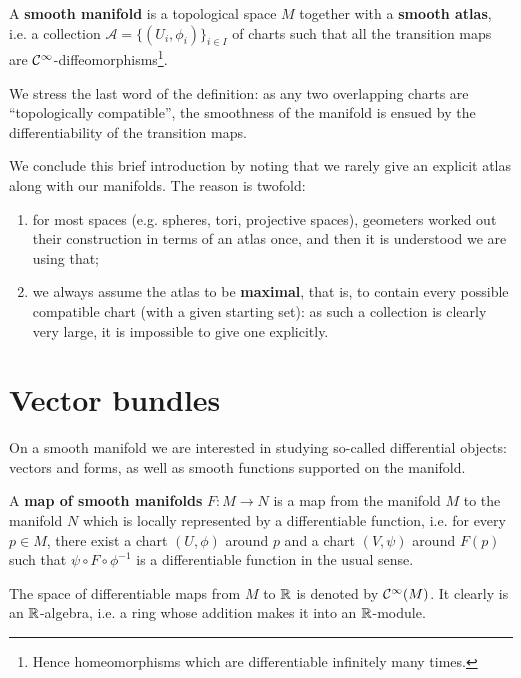 \documentclass[main.tex]{subfiles}
\begin{document}
\begin{definition}
	A \textbf{smooth manifold} is a topological space $M$ together with a \textbf{smooth atlas}, i.e. a collection $\mathcal A = \{(U_i, \phi_i)\}_{i \in I}$ of charts such that all the transition maps are $\mathcal{C}^\infty$-diffeomorphisms\footnote{Hence homeomorphisms which are differentiable infinitely many times.}.
\end{definition}

\begin{remark}
	We stress the last word of the definition: as any two overlapping charts are ``topologically compatible'', the smoothness of the manifold is ensued by the differentiability of the transition maps.
\end{remark}

We conclude this brief introduction by noting that we rarely give an explicit atlas along with our manifolds. The reason is twofold:
\begin{enumerate}
	\item for most spaces (e.g. spheres, tori, projective spaces), geometers worked out their construction in terms of an atlas once, and then it is understood we are using that;
	\item we always assume the atlas to be \textbf{maximal}, that is, to contain every possible compatible chart (with a given starting set): as such a collection is clearly very large, it is impossible to give one explicitly.
\end{enumerate}

\section{Vector bundles}
On a smooth manifold we are interested in studying so-called differential objects: vectors and forms, as well as smooth functions supported on the manifold.

\begin{definition}
	A \textbf{map of smooth manifolds} $F:M \to N$ is a map from the manifold $M$ to the manifold $N$ which is locally represented by a differentiable function, i.e. for every $p \in M$, there exist a chart $(U, \phi)$ around $p$ and a chart $(V, \psi)$ around $F(p)$ such that $\psi \circ F \circ \phi^{-1}$ is a differentiable function in the usual sense.
\end{definition}

The space of differentiable maps from $M$ to $\mathbb{R}$ is denoted by $\mathcal{C}^\infty(M)$. It clearly is an $\mathbb{R}$-algebra, i.e. a ring whose addition makes it into an $\mathbb{R}$-module.
\end{document}
